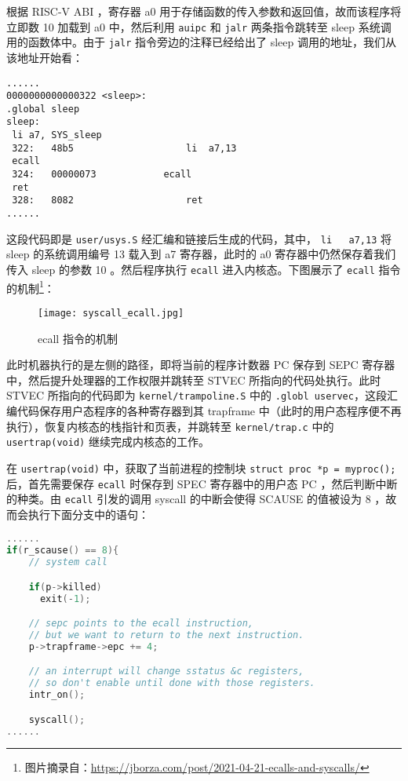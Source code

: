 根据 RISC-V ABI ，寄存器 a0 用于存储函数的传入参数和返回值，故而该程序将立即数 10 加载到 a0 中，然后利用 \lstinline{auipc} 和 \lstinline{jalr} 两条指令跳转至 sleep 系统调用的函数体中。由于 \lstinline{jalr} 指令旁边的注释已经给出了 sleep 调用的地址，我们从该地址开始看：
\begin{lstlisting}
......
0000000000000322 <sleep>:
.global sleep
sleep:
 li a7, SYS_sleep
 322:	48b5                	li	a7,13
 ecall
 324:	00000073          	ecall
 ret
 328:	8082                	ret
......
\end{lstlisting}

这段代码即是 \lstinline{user/usys.S} 经汇编和链接后生成的代码，其中， \lstinline{li	a7,13} 将 sleep 的系统调用编号 13 载入到 a7 寄存器，此时的 a0 寄存器中仍然保存着我们传入 sleep 的参数 10 。然后程序执行 \lstinline{ecall} 进入内核态。下图展示了 \lstinline{ecall} 指令的机制\footnote{图片摘录自：\url{https://jborza.com/post/2021-04-21-ecalls-and-syscalls/}}：
\begin{figure}[H]
  \centering
  \texttt{[image: syscall\_ecall.jpg]}
  \caption{ ecall 指令的机制}
\end{figure}

此时机器执行的是左侧的路径，即将当前的程序计数器 PC 保存到 SEPC 寄存器中，然后提升处理器的工作权限并跳转至 STVEC 所指向的代码处执行。此时 STVEC 所指向的代码即为 \lstinline{kernel/trampoline.S} 中的 \lstinline{.globl uservec}，这段汇编代码保存用户态程序的各种寄存器到其 trapframe 中（此时的用户态程序便不再执行），恢复内核态的栈指针和页表，并跳转至 \lstinline{kernel/trap.c} 中的 \lstinline{usertrap(void)} 继续完成内核态的工作。

在 \lstinline{usertrap(void)} 中，获取了当前进程的控制块 \lstinline{struct proc *p = myproc();} 后，首先需要保存 \lstinline{ecall} 时保存到 SPEC 寄存器中的用户态 PC ，然后判断中断的种类。由 \lstinline{ecall} 引发的调用 syscall 的中断会使得 SCAUSE 的值被设为 8 ，故而会执行下面分支中的语句：
\begin{lstlisting}[language=C]
......
if(r_scause() == 8){
    // system call

    if(p->killed)
      exit(-1);

    // sepc points to the ecall instruction,
    // but we want to return to the next instruction.
    p->trapframe->epc += 4;

    // an interrupt will change sstatus &c registers,
    // so don't enable until done with those registers.
    intr_on();

    syscall();
......
\end{lstlisting}

